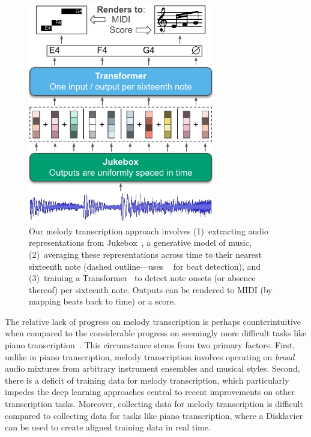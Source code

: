 \begin{figure}
    \centering
    \includegraphics[width=8.1cm]{figs/fig1.pdf}
    \caption{
Our melody transcription approach involves 
(1)~extracting audio representations from Jukebox~\cite{dhariwal2020jukebox}, a generative model of music, 
(2)~averaging these representations across time to their nearest sixteenth note (dashed outline---uses \madmom{}~\cite{bock2016joint,bock2016madmom} for beat detection),
and
(3)~training a Transformer~\cite{vaswani2017attention} to detect note onsets (or absence thereof) per sixteenth note. 
Outputs can be rendered to MIDI (by mapping beats back to time) or a score.
}
 \label{fig:fig1}
 \vspace{-5mm}
\end{figure}

The relative lack of progress on melody transcription is perhaps counterintuitive when compared to the considerable progress on seemingly more difficult tasks like piano transcription~\cite{sigtia2016end,hawthorne2017onsets}.
This circumstance stems from two primary factors.
First, unlike in piano transcription, melody transcription involves operating on \emph{broad}
audio mixtures from arbitrary instrument ensembles and musical styles. 
Second, there is a deficit of training data for melody transcription, which particularly impedes the deep learning approaches central to recent improvements on other transcription tasks. 
Moreover, collecting data for melody transcription is difficult compared to collecting data for tasks like piano transcription, where a Disklavier can be used to create aligned training data in real time. 

